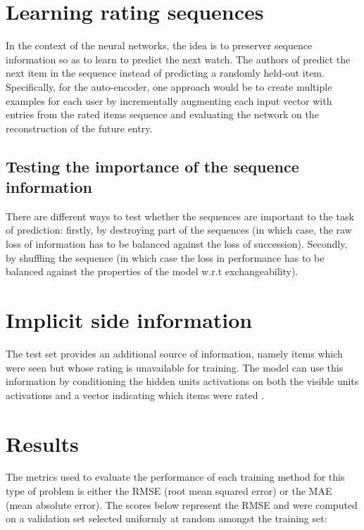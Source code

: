 \documentclass[10pt,twocolumn]{article}
\begin{document}
\section{Learning rating sequences}

 In the context of the neural networks, the idea is to preserver sequence information so as to learn to predict the next watch. The authors of \cite{youtube2016} predict the next item in the sequence instead of predicting a randomly held-out item. Specifically, for the auto-encoder, one approach would be to create multiple examples for each user by incrementally augmenting each input vector with entries from the rated items sequence and evaluating the network on the reconstruction of the future entry.
 
 
\subsection{Testing the importance of the sequence information}

There are different ways to test whether the sequences are important to the task of prediction: firstly, by destroying part of the sequences (in which case, the raw loss of information has to be balanced against the loss of succession). Secondly, by shuffling the sequence (in which case the loss in performance has to be balanced against the properties of the model w.r.t exchangeability).

\section{Implicit side information}

The test set provides an additional source of information, namely items which were seen but whose rating is unavailable for training. The model can use this information by conditioning the hidden units activations on both the visible units activations and a vector indicating which items were rated \cite{salakhutdinov2007restricted}.

\section{Results}

The metrics used to evaluate the performance of each training method for this type of problem is either the RMSE (root mean squared error) or the MAE (mean absolute error). The scores below represent the RMSE and were computed on a validation set selected uniformly at random amongst the training set:
\end{document}
